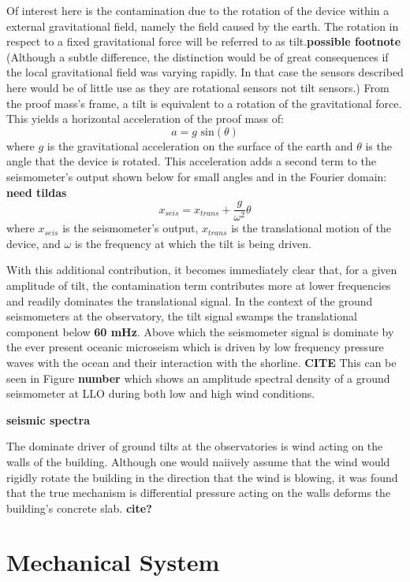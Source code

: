 \documentclass [12pt, proquest]{uwthesis}[2019]
\begin{document}
Of interest here is the contamination due to the rotation of the device within a external gravitational field, namely the field caused by the earth. The rotation in respect to a fixed gravitational force will be referred to as tilt.\textbf{possible footnote} (Although a subtle difference, the distinction would be of great consequences if the local gravitational field was varying rapidly. In that case the sensors described here would be of little use as they are rotational sensors not tilt sensors.) From the proof mass's frame, a tilt is equivalent to a rotation of the gravitational force. This yields a horizontal acceleration of the proof mass of:
\[ a=g \text{ sin}(\theta)\]
where $g$ is the gravitational acceleration on the surface of the earth and $\theta$ is the angle that the device is rotated. This acceleration adds a second term to the seismometer's output shown below for small angles and in the Fourier domain: \textbf{need tildas}
\[x_{seis}=x_{trans}+\frac{g}{\omega^2}\theta\]
where $x_{seis}$ is the seismometer's output, $x_{trans}$ is the translational motion of the device, and $\omega$ is the frequency at which the tilt is being driven. 

With this additional contribution, it becomes immediately clear that, for a given amplitude of tilt, the contamination term contributes more at lower frequencies and readily dominates the translational signal. In the context of the ground seismometers at the observatory, the tilt signal swamps the translational component below \textbf{60 mHz}. Above which the seismometer signal is dominate by the ever present oceanic microseism which is driven by low frequency pressure waves with the ocean and their interaction with the shorline. \textbf{CITE} This can be seen in Figure \textbf{number} which shows an amplitude spectral density of a ground seismometer at LLO during both low and high wind conditions.

\textbf{seismic spectra}

The dominate driver of ground tilts at the observatories is wind acting on the walls of the building. Although one would naiively assume that the wind would rigidly rotate the building in the direction that the wind is blowing, it was found that the true mechanism is differential pressure acting on the walls deforms the building's concrete slab. \textbf{cite?} 


\section{Mechanical System}
\end{document}
